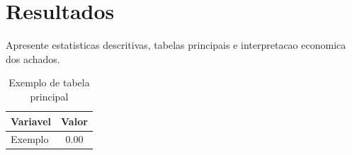 \section{Resultados}

Apresente estatisticas descritivas, tabelas principais e interpretacao economica dos achados.

\begin{table}[H]
    \centering
    \caption{Exemplo de tabela principal}
    \begin{tabular}{lc}
        \toprule
        Variavel & Valor \\
        \midrule
        Exemplo & 0.00 \\
        \bottomrule
    \end{tabular}
\end{table}